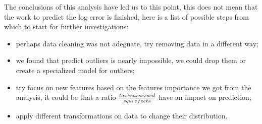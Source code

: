 The conclusions of this analysis have led us to this point, this does not mean that the work to predict the log error is finished, here is a list of possible steps from which to start for further investigations:

\begin{itemize}
  \item perhaps data cleaning was not adeguate, try removing data in a different way;
  \item we found that predict outliers is nearly impossible, we could drop them or create a specialized model for outliers;
  \item try focus on new features based on the features importance we got from the analysis, it could be that a ratio $taxes assessed \over sqare feets$ have an impact on prediction;
  \item apply different transformations on data to change their distribution.
\end{itemize}
